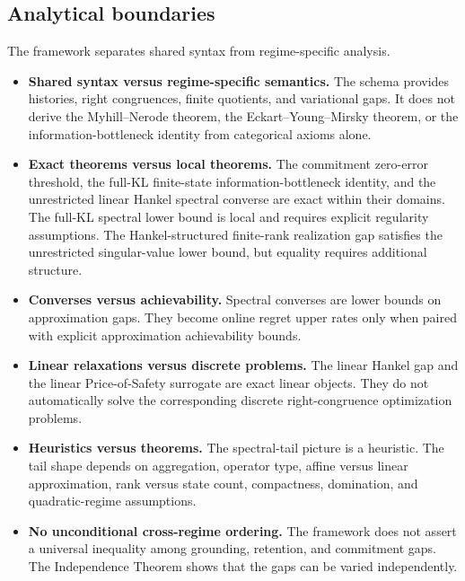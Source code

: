 \documentclass[12pt]{article}
\theoremstyle{definition}
\begin{document}
\subsection{Analytical boundaries}
\label{subsec:boundaries-intro}

The framework separates shared syntax from regime-specific analysis.

\begin{itemize}[leftmargin=2.0em]
\item \textbf{Shared syntax versus regime-specific semantics.}
The schema provides histories, right congruences, finite quotients, and
variational gaps.  It does not derive the Myhill--Nerode theorem, the
Eckart--Young--Mirsky theorem, or the information-bottleneck identity from
categorical axioms alone.

\item \textbf{Exact theorems versus local theorems.}
The commitment zero-error threshold, the full-KL finite-state
information-bottleneck identity, and the unrestricted linear Hankel spectral
converse are exact within their domains.  The full-KL spectral lower bound is
local and requires explicit regularity assumptions.  The Hankel-structured
finite-rank realization gap satisfies the unrestricted singular-value lower
bound, but equality requires additional structure.

\item \textbf{Converses versus achievability.}
Spectral converses are lower bounds on approximation gaps.  They become
online regret upper rates only when paired with explicit approximation
achievability bounds.

\item \textbf{Linear relaxations versus discrete problems.}
The linear Hankel gap and the linear Price-of-Safety surrogate are exact
linear objects.  They do not automatically solve the corresponding discrete
right-congruence optimization problems.

\item \textbf{Heuristics versus theorems.}
The spectral-tail picture is a heuristic.  The tail shape depends on
aggregation, operator type, affine versus linear approximation, rank versus
state count, compactness, domination, and quadratic-regime assumptions.

\item \textbf{No unconditional cross-regime ordering.}
The framework does not assert a universal inequality among grounding,
retention, and commitment gaps.  The Independence Theorem shows that the
gaps can be varied independently.
\end{itemize}
\end{document}
